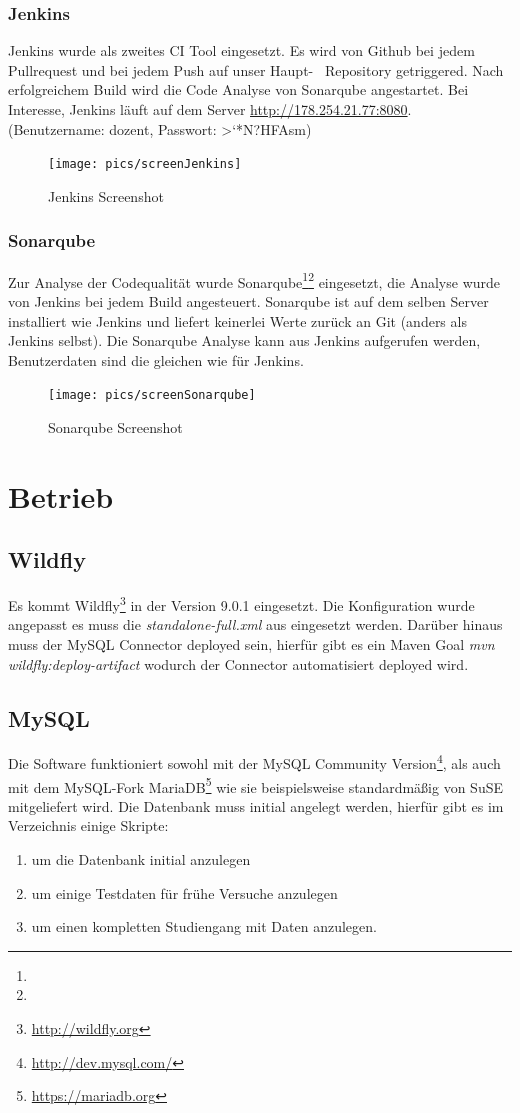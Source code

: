 \documentclass[12pt,a4paper,parskip]{scrreprt}
\begin{document}
\subsubsection{Jenkins}
Jenkins wurde als zweites CI Tool eingesetzt. Es wird von Github bei jedem Pullrequest und bei jedem Push auf unser \glqq Haupt- \grqq\ Repository getriggered. Nach erfolgreichem Build wird die Code Analyse von Sonarqube angestartet. Bei Interesse, Jenkins läuft auf dem Server \url{http://178.254.21.77:8080}. (Benutzername: dozent, Passwort: >`*N?HFAsm)
\begin{figure}[!hbtp]%
\centering
\texttt{[image: pics/screenJenkins]}
\caption[Jenkins]{Jenkins Screenshot}
\label{fig:screenJenkins}
\end{figure}
\subsubsection{Sonarqube}
Zur Analyse der Codequalität wurde Sonarqube\footnote{}\footnote{} eingesetzt, die Analyse wurde von Jenkins bei jedem Build angesteuert. Sonarqube ist auf dem selben Server installiert wie Jenkins und liefert keinerlei Werte zurück an Git (anders als Jenkins selbst). Die Sonarqube Analyse kann aus Jenkins aufgerufen werden, Benutzerdaten sind die gleichen wie für Jenkins.
\begin{figure}[!hbtp]%
\centering
\texttt{[image: pics/screenSonarqube]}
\caption[Sonarqube]{Sonarqube Screenshot}
\label{fig:screenSonarqube}
\end{figure}
\section{Betrieb}
\subsection{Wildfly}
Es kommt Wildfly\footnote{\url{http://wildfly.org}} in der Version 9.0.1 eingesetzt. Die Konfiguration wurde angepasst es muss die \textit{standalone-full.xml} aus  eingesetzt werden. Darüber hinaus muss der MySQL Connector deployed sein, hierfür gibt es ein Maven Goal \textit{mvn wildfly:deploy-artifact} wodurch der Connector automatisiert deployed wird.
\subsection{MySQL}
Die Software funktioniert sowohl mit der MySQL Community Version\footnote{\url{http://dev.mysql.com/}}, als auch mit dem MySQL-Fork MariaDB\footnote{\url{https://mariadb.org}} wie sie beispielsweise standardmäßig von SuSE mitgeliefert wird.
Die Datenbank muss initial angelegt werden, hierfür gibt es im Verzeichnis  einige Skripte:
\begin{enumerate}
	\item {} um die Datenbank initial anzulegen
	\item {} um einige Testdaten für frühe Versuche anzulegen
	\item {} um einen kompletten Studiengang mit Daten anzulegen.
\end{enumerate}
\end{document}
